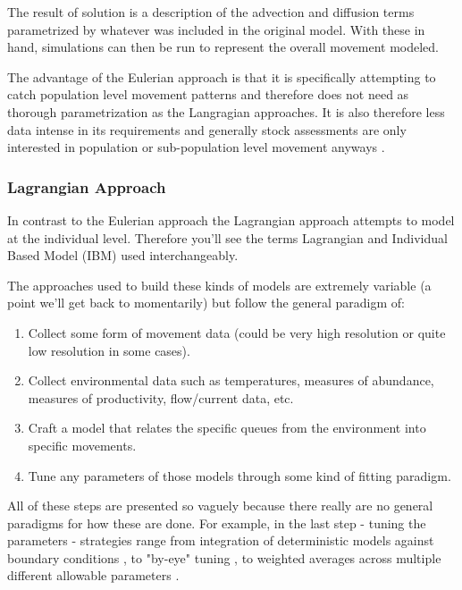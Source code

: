 \documentclass[11pt]{article}
\begin{document}
The result of solution is a description of the advection and diffusion terms parametrized by whatever was included in the original model. With these in hand, simulations can then be run to represent the overall movement modeled.

The advantage of the Eulerian approach is that it is specifically attempting to catch population level movement patterns and therefore does not need as thorough parametrization as the Langragian approaches. It is also therefore less data intense in its requirements and generally stock assessments are only interested in population or sub-population level movement anyways \citep{lehodey2008}. 


\subsubsection{Lagrangian Approach}

In contrast to the Eulerian approach the Lagrangian approach attempts to model at the individual level. Therefore you'll see the terms Lagrangian and Individual Based Model (IBM) used interchangeably. 

The approaches used to build these kinds of models are extremely variable \citep{grimm} (a point we'll get back to momentarily) but follow the general paradigm of:

\begin{enumerate}
\item Collect some form of movement data (could be very high resolution or quite low resolution in some cases).
\item Collect environmental data such as temperatures, measures of abundance, measures of productivity, flow/current data, etc.
\item Craft a model that relates the specific queues from the environment into specific movements.
\item Tune any parameters of those models through some kind of fitting paradigm.
\end{enumerate}

All of these steps are presented so vaguely because there really are no general paradigms for how these are done. For example, in the last step - tuning the parameters - strategies range from integration of deterministic models against boundary conditions \citep{phillipsa2018}, to "by-eye" tuning \citep{goodwin2006}, to weighted averages across multiple different allowable parameters \citep{burke2016}. \newline
\end{document}
